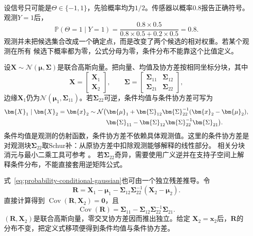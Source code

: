 \begin{example}[有限候选经过带噪观测更新]
\label{ex:probability-finite-candidate-bayes}
设信号只可能是\(\Theta\in\{-1,1\}\)，先验概率均为\(1/2\)。传感器以概率\(0.8\)报告正确符号。观测\(Y=1\)后，
\[ \mathbb{P}(\Theta=1\mid Y=1)
  =\frac{0.8\times0.5}{0.8\times0.5+0.2\times0.5}=0.8. \]
观测并未把候选集合改成一个确定点，而是改变了两个候选的相对权重。若某个观测在所有
候选下概率都为零，公式分母为零，条件分布不能靠这个比值定义。
\end{example}
设\(\bm X\sim\mathcal N(\bm\mu,\bm\Sigma)\)是联合高斯向量。把向量、均值及协方差按相同坐标分块，其中
\[
  \bm{X}=
  \begin{bmatrix}\bm{X}_1\\\bm{X}_2\end{bmatrix},
  \qquad
  \bm{\Sigma}=
  \begin{bmatrix}
    \bm{\Sigma}_{11}&\bm{\Sigma}_{12}\\
    \bm{\Sigma}_{21}&\bm{\Sigma}_{22}
  \end{bmatrix},
\]
边缘\(\bm{X}_1\)仍为\(\mathcal{N}(\bm{\mu}_1,\bm{\Sigma}_{11})\)。若\(\bm{\Sigma}_{22}\)可逆，条件均值与条件协方差可写为
\begin{align}
  \bm{X}_1\mid\bm{X}_2=\bm{x}_2
  \sim\mathcal{N}\bigl(
  &\bm{\mu}_1+
  \bm{\Sigma}_{12}\bm{\Sigma}_{22}^{-1}
  (\bm{x}_2-\bm{\mu}_2),\notag\\
  &\bm{\Sigma}_{11}
  -\bm{\Sigma}_{12}\bm{\Sigma}_{22}^{-1}
  \bm{\Sigma}_{21}
  \bigr).
  \label{eq:probability-conditional-gaussian}
\end{align}
条件均值是观测的仿射函数，条件协方差不依赖具体观测值。这里的条件协方差是对观测块\(\bm\Sigma_{22}\)取Schur补：从原协方差中扣除观测能够解释的线性部分。
相关分块消元与最小二乘工具可参考
。
若\(\bm\Sigma_{22}\)奇异，需要使用广义逆并在支持子空间上解释条件分布，不能直接套用逆矩阵公式。

式~\eqref{eq:probability-conditional-gaussian}也可由一个独立残差推导。令
\[
  \bm{R}
  =\bm{X}_1-\bm{\mu}_1
   -\bm{\Sigma}_{12}\bm{\Sigma}_{22}^{-1}
    (\bm{X}_2-\bm{\mu}_2).
\]
直接计算得到
\(\operatorname{Cov}(\bm{R},\bm{X}_2)=\bm{0}\)，且
\[
  \operatorname{Cov}(\bm{R})
  =\bm{\Sigma}_{11}
   -\bm{\Sigma}_{12}\bm{\Sigma}_{22}^{-1}\bm{\Sigma}_{21}.
\]
\((\bm{R},\bm{X}_2)\)是联合高斯向量，零交叉协方差因而推出独立。给定
\(\bm{X}_2=\bm{x}_2\)后，\(\bm{R}\)的分布不变，把定义式移项便得到条件均值与条件协方差。

